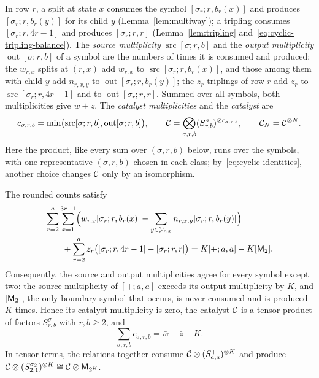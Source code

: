 In row \(r\), a split at state \(x\) consumes the symbol
\([\sigma_r;r,b_r(x)]\) and produces \([\sigma_r;r,b_r(y)]\) for its child
\(y\) (Lemma~\ref{lem:multiway}); a tripling consumes
\([\sigma_r;r,4r-1]\) and produces \([\sigma_r;r,r]\)
(Lemma~\ref{lem:tripling} and~\eqref{eq:cyclic-tripling-balance}). The
\emph{source multiplicity} \(\operatorname{src}[\sigma;r,b]\) and the
\emph{output multiplicity} \(\operatorname{out}[\sigma;r,b]\) of a symbol
are the numbers of times it is consumed and produced: the \(w_{r,x}\) splits
at \((r,x)\) add \(w_{r,x}\) to \(\operatorname{src}[\sigma_r;r,b_r(x)]\),
and those among them with child \(y\) add \(n_{r,x,y}\) to
\(\operatorname{out}[\sigma_r;r,b_r(y)]\); the \(z_r\) triplings of row
\(r\) add \(z_r\) to \(\operatorname{src}[\sigma_r;r,4r-1]\) and to
\(\operatorname{out}[\sigma_r;r,r]\). Summed over all symbols, both
multiplicities give \(\bar w+\bar z\). The \emph{catalyst multiplicities}
and the \emph{catalyst} are
\begin{equation}\label{eq:rounded-catalyst}
 c_{\sigma,r,b}=\min\bigl(\operatorname{src}[\sigma;r,b],
                          \operatorname{out}[\sigma;r,b]\bigr),
 \qquad
 \mathcal C=\bigotimes_{\sigma,r,b}(S^\sigma_{r,b})^{\otimes c_{\sigma,r,b}},
 \qquad \mathcal C_N=\mathcal C^{\otimes N}.
\end{equation}
Here the product, like every sum over \((\sigma,r,b)\) below, runs over the
symbols, with one representative \((\sigma,r,b)\) chosen in each class;
by~\eqref{eq:cyclic-identities}, another choice changes \(\mathcal C\) only by an
isomorphism.

\begin{proposition}\label{prop:rounded-ledger}
The rounded counts satisfy
\begin{align}
 &\sum_{r=2}^a\sum_{x=1}^{3r-1}
 \Bigl(w_{r,x}[\sigma_r;r,b_r(x)]
       -\sum_{y\in\mathcal Y_{r,x}}n_{r,x,y}[\sigma_r;r,b_r(y)]\Bigr)
 \notag\\
 &\qquad+\sum_{r=2}^az_r
   \bigl([\sigma_r;r,4r-1]-[\sigma_r;r,r]\bigr)
 =K[+;a,a]-K[\mathsf M_2].\label{eq:rounded-ledger}
\end{align}
Consequently, the source and output multiplicities agree for every symbol
except two: the source multiplicity of \([+;a,a]\) exceeds its output
multiplicity by \(K\), and \([\mathsf M_2]\), the only boundary symbol that
occurs, is never consumed and is produced \(K\) times. Hence its catalyst
multiplicity is zero, the catalyst \(\mathcal C\) is a tensor product of factors
\(S^\sigma_{r,b}\) with \(r,b\ge2\), and
\begin{equation}\label{eq:catalyst-size}
 \sum_{\sigma,r,b}c_{\sigma,r,b}=\bar w+\bar z-K.
\end{equation}
In tensor terms, the relations together consume
\(\mathcal C\otimes(S^+_{a,a})^{\otimes K}\) and produce
\(\mathcal C\otimes(S^{\sigma_2}_{2,1})^{\otimes K}\cong\mathcal C\otimes\mathsf M_{2^K}\).
\end{proposition}


